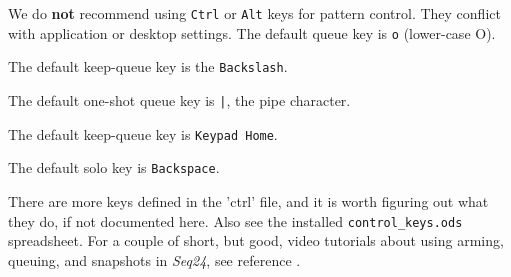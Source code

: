    We do \textbf{not}
   recommend using \texttt{Ctrl} or \texttt{Alt}
   keys for pattern control.  They conflict with application or desktop
   settings.
   The default queue key is \texttt{o} (lower-case O).

   The default keep-queue key is the \texttt{Backslash}.

   The default one-shot queue key is \texttt{|}, the pipe character.

   The default keep-queue key is \texttt{Keypad Home}.

   The default solo key is \texttt{Backspace}.

   There are more keys defined in the 'ctrl' file, and it is
   worth figuring out what they do, if not documented here.
   Also see the installed \texttt{control\_keys.ods} spreadsheet.
   For a couple of short, but good, video tutorials about using arming,
   queuing, and snapshots in \textsl{Seq24}, see reference \cite{wootangent1}.

